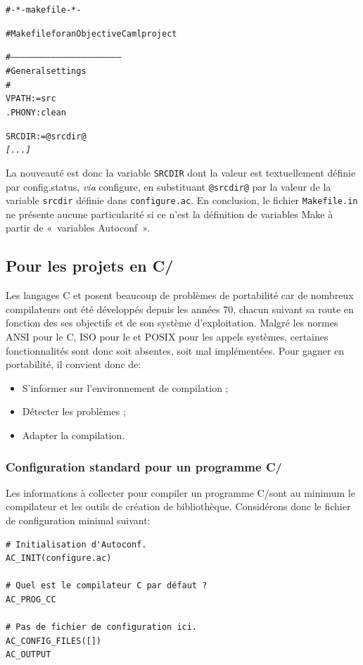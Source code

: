 \documentclass[11pt,a4paper]{article}
\newcommand{\bitem}{\item[$\bullet$]}
\begin{document}
{\small
\begin{alltt}
# -*-makefile-*-

# Makefile for an Objective Caml project

# -----------------------------------------------------------------
# General settings
#
VPATH := src
.PHONY: clean

SRCDIR := @srcdir@
\emph{[...]}
\end{alltt}
}

\noindent La nouveauté est donc la variable \texttt{SRCDIR} dont la
valeur est textuellement définie par \textsf{config.status},
\emph{via} \textsf{configure}, en substituant \verb|@srcdir@| par la
valeur de la variable \texttt{srcdir} définie dans
\texttt{configure.ac}. En conclusion, le fichier \texttt{Makefile.in}
ne présente aucune particularité si ce n'est la définition de
variables \textsf{Make} à partir de «~variables \textsf{Autoconf}~».


\subsection{Pour les projets en \textsf{C/\cpp}}

Les langages C et \cpp{} posent beaucoup de problèmes de portabilité car
de nombreux compilateurs ont été développés depuis les années 70,
chacun suivant sa route en fonction des ses objectifs et de son
système d'exploitation. Malgré les normes ANSI pour le C, ISO pour le
\cpp et POSIX pour les appels systèmes, certaines fonctionnalités sont
donc soit absentes, soit mal implémentées. Pour gagner en
portabilité, il convient donc de:

\begin{itemize}
\bitem S'informer sur l'environnement de compilation ;
\bitem Détecter les problèmes ;
\bitem Adapter la compilation.
\end{itemize}

\subsubsection{Configuration standard pour un programme C/\cpp}

Les informations à collecter pour compiler un programme C/\cpp sont au
minimum le compilateur et les outils de création de
bibliothèque. Considérons donc le fichier de configuration minimal
suivant:
{\small
\begin{verbatim}
# Initialisation d'Autoconf.
AC_INIT(configure.ac)

# Quel est le compilateur C par défaut ?
AC_PROG_CC

# Pas de fichier de configuration ici.
AC_CONFIG_FILES([])
AC_OUTPUT
\end{verbatim}
}
\end{document}
